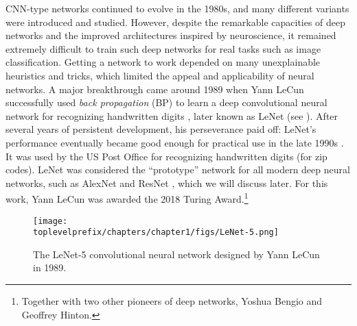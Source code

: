 \documentclass[../../book-main.tex]{subfiles}
\begin{document}
CNN-type networks continued to evolve in the 1980s, and many different variants were introduced and studied. However, despite the remarkable capacities of deep networks and the improved architectures inspired by neuroscience, it remained extremely difficult to train such deep networks for real tasks such as image classification. Getting a network to work depended on many unexplainable heuristics and tricks, which limited the appeal and applicability of neural networks. A major breakthrough came around 1989 when Yann LeCun successfully used \textit{back propagation} (BP) to learn a deep convolutional neural network for recognizing handwritten digits \cite{LeCun-1989}, later known as LeNet (see ). After several years of persistent development, his perseverance paid off: LeNet's performance eventually became good enough for practical use in the late 1990s \cite{LeCun-1998}. It was used by the US Post Office for recognizing handwritten digits (for zip codes). LeNet was considered the ``prototype'' network for all modern deep neural networks, such as AlexNet \cite{krizhevsky2012imagenet} and ResNet \cite{he2016deep}, which we will discuss later. For this work, Yann LeCun was awarded the 2018 Turing Award.\footnote{Together with two other pioneers of deep networks, Yoshua Bengio and Geoffrey Hinton.}

\begin{figure}
    \centering
    \texttt{[image: \\toplevelprefix/chapters/chapter1/figs/LeNet-5.png]}
    \caption{The LeNet-5 convolutional neural network designed by Yann LeCun in 1989.}
    \label{fig:LeNet-5}
\end{figure}
\end{document}
